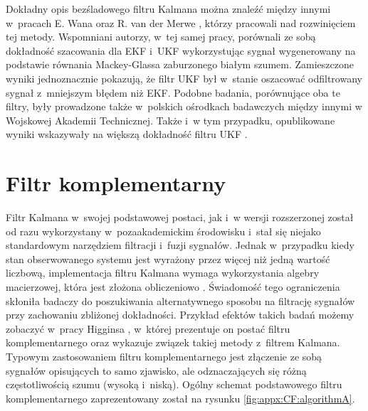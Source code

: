 		
Dokładny opis bezśladowego filtru Kalmana można znaleźć między innymi w~pracach E. Wana oraz R. van der Merwe \cite{Wan2000, Wan2001}, którzy pracowali nad rozwinięciem tej metody. Wspomniani autorzy, w~tej samej pracy, porównali ze sobą dokładność szacowania dla EKF i~UKF wykorzystując sygnał wygenerowany na podstawie równania Mackey-Glassa \cite{Glass2010} zaburzonego białym szumem. Zamieszczone wyniki jednoznacznie pokazują, że filtr UKF był w~stanie oszacować odfiltrowany sygnał z~mniejszym błędem niż EKF. Podobne badania, porównujące oba te filtry, były prowadzone także w~polskich ośrodkach badawczych między innymi w Wojskowej Akademii Technicznej. Także i~w tym przypadku, opublikowane wyniki wskazywały na większą dokładność filtru UKF \cite{Konatowski2007, Konatowski2007a}.
		
\section*{Filtr komplementarny}\label{sec:appx:filters:CF}
Filtr Kalmana w~swojej podstawowej postaci, jak i~w wersji rozszerzonej został od razu wykorzystany w~pozaakademickim środowisku i~stał się niejako standardowym narzędziem filtracji i~fuzji sygnałów. Jednak w~przypadku kiedy stan obserwowanego systemu jest wyrażony przez więcej niż jedną wartość liczbową, implementacja filtru Kalmana wymaga wykorzystania algebry macierzowej, która jest złożona obliczeniowo \cite{wiki:MatrixAlgebraComplexity2016}. Świadomość tego ograniczenia skłoniła badaczy do poszukiwania alternatywnego sposobu na filtrację sygnałów przy zachowaniu zbliżonej dokładności. Przykład efektów takich badań możemy zobaczyć w~pracy Higginsa \cite{Higgins1975}, w~której prezentuje on postać filtru komplementarnego oraz wykazuje związek takiej metody z~filtrem Kalmana. Typowym zastosowaniem filtru komplementarnego jest złączenie ze sobą sygnałów opisujących to samo zjawisko, ale odznaczających się różną częstotliwością szumu (wysoką i~niską). Ogólny schemat podstawowego filtru komplementarnego zaprezentowany został na rysunku \ref{fig:appx:CF:algorithmA}.
		
\newcommand{\suma}{\Large$+$}
\newcommand{\inte}{$\displaystyle \int$}
\newcommand{\derv}{\huge$\frac{d}{dt}$}
		

